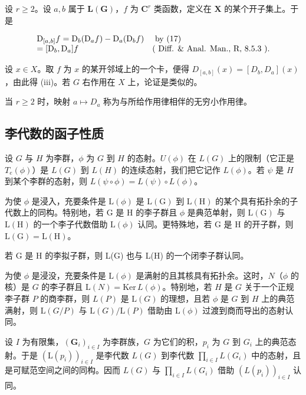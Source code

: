 设 \(r \geqslant 2\)。设 \(a, b\) 属于 \(\mathbf{L}(\mathbf{G})\)，\(f\) 为 \(\mathbf{C}^r\) 类函数，定义在 \(\mathbf{X}\) 的某个开子集上。于是

\[
\begin{array}{l l} \mathrm{D} _ {[ a, b ]} f = \mathrm{D} _ {b} (\mathrm{D} _ {a} f) - \mathrm{D} _ {a} (\mathrm{D} _ {b} f) & \text { by   (17) } \\ = [ \mathrm{D} _ {b}, \mathrm{D} _ {a} ] f & (\text { Diff.   \&   Anal.   Man.,   R,   8.5.3 }). \end{array}
\]

设 \(x \in X\)。取 \(f\) 为 \(x\) 的某开邻域上的一个卡，便得 \(D_{[a,b]}(x) = [D_b, D_a](x)\)，由此得 (iii)。若 \(G\) 右作用在 \(X\) 上，论证是类似的。

当 \(r \geqslant 2\) 时，映射 \(a \mapsto D_{a}\) 称为与所给作用律相伴的无穷小作用律。

\subsection{李代数的函子性质}

设 \(G\) 与 \(H\) 为李群，\(\phi\) 为 \(G\) 到 \(H\) 的态射。\(U(\phi)\) 在 \(L(G)\) 上的限制（它正是 \(T_e(\phi)\)）是 \(L(G)\) 到 \(L(H)\) 的连续态射，我们把它记作 \(L(\phi)\)。若 \(\psi\) 是 \(H\) 到某个李群的态射，则 \(L(\psi \circ \phi) = L(\psi) \circ L(\phi)\)。

为使 \(\phi\) 是浸入，充要条件是 \(\mathrm{L}(\phi)\) 是 \(\mathrm{L}(\mathrm{G})\) 到 \(\mathrm{L}(\mathrm{H})\) 的某个具有拓扑余的子代数上的同构。特别地，若 \(\mathrm{G}\) 是 \(\mathrm{H}\) 的李子群且 \(\phi\) 是典范单射，则 \(\mathrm{L}(\mathrm{G})\) 与 \(\mathrm{L}(\mathrm{H})\) 的一个李子代数借助 \(\mathrm{L}(\phi)\) 认同。更特殊地，若 \(\mathrm{G}\) 是 \(\mathrm{H}\) 的开子群，则 \(\mathrm{L}(\mathrm{G}) = \mathrm{L}(\mathrm{H})\)。

若 G 是 H 的李拟子群，则 L(G) 也与 L(H) 的一个闭李子群认同。

为使 \(\phi\) 是浸没，充要条件是 \(\mathrm{L}(\phi)\) 是满射的且其核具有拓扑余。这时，\(N\)（\(\phi\) 的核）是 \(G\) 的李子群且 \(\mathrm{L}(N) = \mathrm{Ker} \, L(\phi)\)。特别地，若 \(H\) 是 \(G\) 关于一个正规李子群 \(P\) 的商李群，则 \(L(P)\) 是 \(\mathrm{L}(G)\) 的理想，且若 \(\phi\) 是 \(G\) 到 \(H\) 上的典范满射，则 \(\mathrm{L}(G/P)\) 与 \(\mathrm{L}(G)/\mathrm{L}(P)\) 借助由 \(\mathrm{L}(\phi)\) 过渡到商而导出的态射认同。

设 \(I\) 为有限集，\((\mathbf{G}_{i})_{i\in I}\) 为李群族，\(G\) 为它们的积，\(p_i\) 为 \(G\) 到 \(G_i\) 上的典范态射。于是 \((\mathrm{L}(p_i))_{i\in I}\) 是李代数 \(L(G)\) 到李代数 \(\prod_{i\in I} L(G_i)\) 中的态射，且是可赋范空间之间的同构。因而 \(L(G)\) 与 \(\prod_{i\in I} L(G_i)\) 借助 \((L(p_i))_{i\in I}\) 认同。

